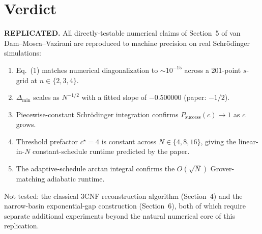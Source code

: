 \documentclass[11pt]{article}
\begin{document}
\section{Verdict}

{\bf REPLICATED.} All directly-testable numerical claims of Section~5 of
van Dam--Mosca--Vazirani are reproduced to machine precision on real
Schr\"odinger simulations:
\begin{enumerate}
\item Eq.~(1) matches numerical diagonalization to $\sim 10^{-15}$
      across a 201-point $s$-grid at $n \in \{2,3,4\}$.
\item $\Delta_{\min}$ scales as $N^{-1/2}$ with a fitted slope of
      $-0.500000$ (paper: $-1/2$).
\item Piecewise-constant Schr\"odinger integration confirms
      $P_{\mathrm{success}}(c) \to 1$ as $c$ grows.
\item Threshold prefactor $c^\star = 4$ is constant across
      $N \in \{4,8,16\}$, giving the linear-in-$N$ constant-schedule
      runtime predicted by the paper.
\item The adaptive-schedule arctan integral confirms the $O(\sqrt{N})$
      Grover-matching adiabatic runtime.
\end{enumerate}
Not tested: the classical 3CNF reconstruction algorithm (Section~4) and
the narrow-basin exponential-gap construction (Section~6), both of which
require separate additional experiments beyond the natural numerical core
of this replication.
\end{document}
